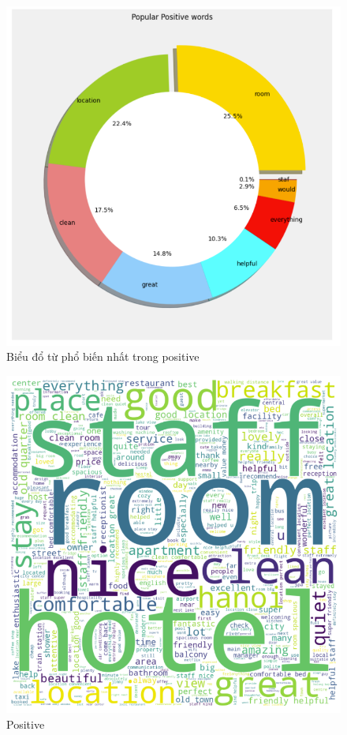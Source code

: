 \begin{enumerate}
    \begin{figure}[H]
        \centering
        \includegraphics[width=1\linewidth]{Figures/8.10.png}
        \caption{Biểu đổ từ phổ biến nhất trong positive}
        \label{fig:enter-label}
    \end{figure}

    \begin{figure}[H]
        \centering
        \includegraphics[width=1\linewidth]{Figures/8.11.png}
        \caption{Positive}
        \label{fig:enter-label}
    \end{figure}
    
\end{enumerate}

